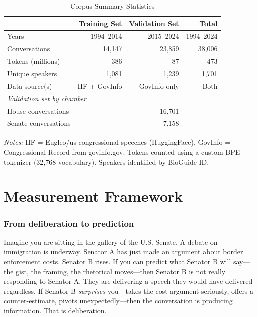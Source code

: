 \documentclass[12pt]{article}
\begin{document}
\begin{table}[H]
\centering
\caption{Corpus Summary Statistics}
\label{tab:corpus}
\begin{threeparttable}
\begin{tabular}{lrrr}
\toprule
& Training Set & Validation Set & Total \\
\midrule
Years & 1994--2014 & 2015--2024 & 1994--2024 \\
Conversations & 14,147 & 23,859 & 38,006 \\
Tokens (millions) & 386 & 87 & 473 \\
Unique speakers & 1,081 & 1,239 & 1,701 \\
Data source(s) & HF + GovInfo & GovInfo only & Both \\
\midrule
\multicolumn{4}{l}{\textit{Validation set by chamber}} \\
\quad House conversations & --- & 16,701 & --- \\
\quad Senate conversations & --- & 7,158 & --- \\
\bottomrule
\end{tabular}
\begin{tablenotes}[flushleft]
\small
\item \textit{Notes:} HF = Eugleo/us-congressional-speeches (HuggingFace). GovInfo = Congressional Record from govinfo.gov. Tokens counted using a custom BPE tokenizer (32,768 vocabulary). Speakers identified by BioGuide ID.
\end{tablenotes}
\end{threeparttable}
\end{table}


\section{Measurement Framework}

\subsubsection*{From deliberation to prediction}
Imagine you are sitting in the gallery of the U.S. Senate. A debate on immigration is underway. Senator A has just made an argument about border enforcement costs. Senator B rises. If you can predict what Senator B will say---the gist, the framing, the rhetorical moves---then Senator B is not really responding to Senator A. They are delivering a speech they would have delivered regardless. If Senator B \textit{surprises} you---takes the cost argument seriously, offers a counter-estimate, pivots unexpectedly---then the conversation is producing information. That is deliberation.
\end{document}
